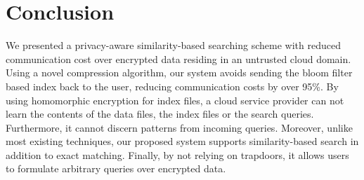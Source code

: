 

\section{Conclusion}
\label{sec:conclusion}

We presented a privacy-aware similarity-based searching scheme
with reduced communication cost over encrypted data residing in an untrusted
cloud domain. Using a novel compression 
algorithm, our system avoids sending the bloom filter based index back to the 
user, reducing communication costs by over 95\%.
By using homomorphic encryption for index files, a cloud service provider can not 
learn the contents of 
the data files, the index files or the search queries. Furthermore, it cannot 
discern patterns from incoming queries. Moreover, unlike most existing techniques, our
proposed system supports similarity-based search in addition to exact matching.
Finally, by not relying on trapdoors, it allows users to formulate
arbitrary queries over encrypted data.

